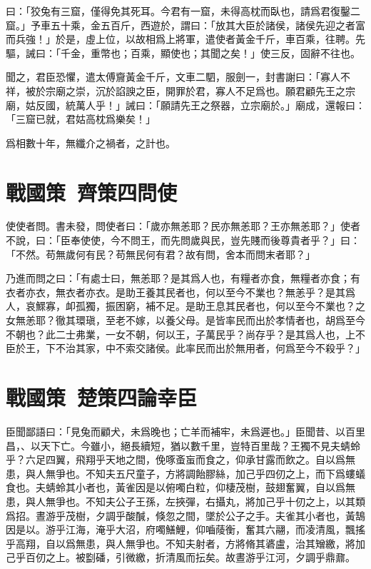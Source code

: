 曰：「狡兔有三窟，僅得免其死耳。今君有一窟，未得高枕而臥也，請爲君復鑿二窟。」予車五十乘，金五百斤，西遊於，謂曰：「放其大臣於諸侯，諸侯先迎之者富而兵強！」於是，虛上位，以故相爲上將軍，遣使者黃金千斤，車百乘，往聘。先驅，誡曰：「千金，重幣也；百乘，顯使也；其聞之矣！」使三反，固辭不往也。

聞之，君臣恐懼，遣太傅齎黃金千斤，文車二駟，服劍一，封書謝曰：「寡人不祥，被於宗廟之崇，沉於諂諛之臣，開罪於君，寡人不足爲也。願君顧先王之宗廟，姑反國，統萬人乎！」誡曰：「願請先王之祭器，立宗廟於。」廟成，還報曰：「三窟已就，君姑高枕爲樂矣！」

爲相數十年，無纖介之禍者，之計也。

\section[趙威后問齊使\quad{\small 戰國策\ 齊策四}]{{\normalsize 戰國策\ 齊策四}\quad {}問使}
使使者問。書未發，問使者曰：「歲亦無恙耶？民亦無恙耶？王亦無恙耶？」使者不說，曰：「臣奉使使，今不問王，而先問歲與民，豈先賤而後尊貴者乎？」曰：「不然。苟無歲何有民？苟無民何有君？故有問，舍本而問末者耶？」

乃進而問之曰：「有處士曰，無恙耶？是其爲人也，有糧者亦食，無糧者亦食；有衣者亦衣，無衣者亦衣。是助王養其民者也，何以至今不業也？無恙乎？是其爲人，哀鰥寡，卹孤獨，振困窮，補不足。是助王息其民者也，何以至今不業也？之女無恙耶？徹其環瑱，至老不嫁，以養父母。是皆率民而出於孝情者也，胡爲至今不朝也？此二士弗業，一女不朝，何以王，子萬民乎？尚存乎？是其爲人也，上不臣於王，下不治其家，中不索交諸侯。此率民而出於無用者，何爲至今不殺乎？」

\section[莊辛論幸臣\quad{\small 戰國策\ 楚策四}]{{\normalsize 戰國策\ 楚策四}\quad {}論幸臣}
臣聞鄙語曰：「見兔而顧犬，未爲晚也；亡羊而補牢，未爲遲也。」臣聞昔、以百里昌，、以天下亡。今雖小，絕長續短，猶以數千里，豈特百里哉？王獨不見夫蜻蛉乎？六足四翼，飛翔乎天地之間，俛啄蚉䖟而食之，仰承甘露而飲之。自以爲無患，與人無爭也。不知夫五尺童子，方將調飴膠絲，加己乎四仞之上，而下爲螻蟻食也。夫蜻蛉其小者也，黃雀因是以俯噣白粒，仰棲茂樹，鼓翅奮翼，自以爲無患，與人無爭也。不知夫公子王孫，左挾彈，右攝丸，將加己乎十仞之上，以其類爲招。晝游乎茂樹，夕調乎酸醎，倏忽之間，墜於公子之手。夫雀其小者也，黃鵠因是以。游乎江海，淹乎大沼，府噣鱔鯉，仰嚙䔖衡，奮其六翮，而凌清風，飄搖乎高翔，自以爲無患，與人無爭也。不知夫射者，方將脩其碆盧，治其矰繳，將加己乎百仞之上。被㔋磻，引微繳，折清風而抎矣。故晝游乎江河，夕調乎鼎鼐。

